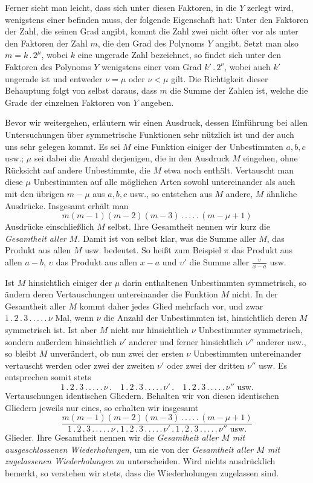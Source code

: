 Ferner sieht man leicht, dass sich unter diesen Faktoren, in die $Y$ zerlegt wird, wenigstens
einer befinden muss, der folgende Eigenschaft hat: Unter den Faktoren der Zahl, die seinen Grad angibt, kommt die Zahl zwei nicht öfter vor als unter den Faktoren der Zahl $m$, die den Grad des Polynoms $Y$ angibt. Setzt man also $m=k\, .\,2^\mu$, wobei $k$ eine ungerade Zahl bezeichnet, so findet sich unter den Faktoren des Polynoms $Y$ wenigstens einer vom Grad $k'\, .\,2^\nu$, wobei auch $k'$ ungerade ist und entweder $\nu=\mu$ oder $\nu<\mu$ gilt. Die Richtigkeit dieser Behauptung folgt von selbst daraus, dass $m$ die Summe der Zahlen ist, welche die Grade der einzelnen Faktoren von $Y$ angeben.

Bevor wir weitergehen, erläutern wir einen Ausdruck, dessen Einführung bei allen Untersuchungen über symmetrische Funktionen sehr nützlich ist und der auch uns sehr gelegen kommt. Es sei $M$ eine Funktion einiger der Unbestimmten $a,b,c$ usw.; $\mu$ sei dabei die Anzahl derjenigen, die in den Ausdruck $M$ eingehen, ohne Rücksicht auf andere Unbestimmte, die $M$ etwa noch enthält. Vertauscht man diese $\mu$ Unbestimmten auf alle möglichen Arten sowohl untereinander als auch mit den übrigen $m-\mu$ aus $a,b,c$ usw., so entstehen aus $M$ andere, $M$ ähnliche Ausdrücke. Insgesamt erhält man
\[
m(m-1)(m-2)(m-3)\, .\, .\, .\, .\, .\,(m-\mu+1)
\]
Ausdrücke einschließlich $M$ selbst. Ihre Gesamtheit nennen wir kurz die \textit{Gesamtheit aller $M$.} Damit ist von selbst klar, was die Summe aller $M$, das Produkt aus allen $M$ usw. bedeutet. So heißt zum Beispiel $\pi$ das Produkt aus allen $a-b$, $\upsilon$ das Produkt aus allen $x-a$ und $\upsilon'$ die Summe aller $\frac{\upsilon}{x-a}$ usw.

Ist $M$ hinsichtlich einiger der $\mu$ darin enthaltenen Unbestimmten symmetrisch, so ändern deren Vertauschungen untereinander die Funktion $M$ nicht. In der Gesamtheit aller $M$ kommt daher jedes Glied mehrfach vor, und zwar $1\, .\,2\, .\,3\, .\, .\, .\, .\, .\,\nu$ Mal, wenn $\nu$ die Anzahl der Unbestimmten ist, hinsichtlich deren $M$ symmetrisch ist. Ist aber $M$ nicht nur hinsichtlich $\nu$ Unbestimmter symmetrisch, sondern außerdem hinsichtlich $\nu'$ anderer und ferner hinsichtlich $\nu''$ anderer usw., so bleibt $M$ unverändert, ob nun zwei der ersten $\nu$ Unbestimmten untereinander vertauscht werden oder zwei der zweiten $\nu'$ oder zwei der dritten $\nu''$ usw. Es entsprechen somit stets
\[
1\, .\,2\, .\,3\, .\, .\, .\, .\, .\,\nu\, .\quad1\, .\,2\, .\,3\, .\, .\, .\, .\, .\,\nu'\, .\quad1\, .\,2\, .\,3\, .\, .\, .\, .\, .\,\nu''\text{ usw.}
\]
Vertauschungen identischen Gliedern. Behalten wir von diesen identischen Gliedern jeweils nur eines, so erhalten wir insgesamt
\[
\frac{m(m-1)(m-2)(m-3)\, .\, .\, .\, .\, .\,(m-\mu+1)}{1\, .\,2\, .\,3\, .\, .\, .\, .\, .\,\nu\, .\,1\, .\,2\, .\,3\, .\, .\, .\, .\, .\,\nu'\, .\,1\, .\,2\, .\,3\, .\, .\, .\, .\, .\,\nu''\text{ usw.}}
\]
Glieder. Ihre Gesamtheit nennen wir die \textit{Gesamtheit aller $M$ mit ausgeschlossenen Wiederholungen}, um sie von der \textit{Gesamtheit aller $M$ mit zugelassenen Wiederholungen} zu unterscheiden. Wird nichts ausdrücklich bemerkt, so verstehen wir stets, dass die Wiederholungen zugelassen sind.


